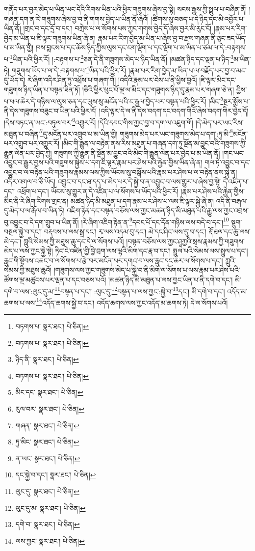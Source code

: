 གནོད་པར་བྱར་མེད་པ་ཡིན་ཡང་དེའི་རིགས་ཡིན་པའི་ཕྱིར་གཟུགས་ཞེས་བྱ་སྟེ། སངས་རྒྱས་ཀྱི་སྤྲུལ་པ་བཞིན་ནོ། །གཞན་དག་ན་རེ་གཟུགས་ཞེས་བྱ་བ་ནི་གགས་བྱེད་པ་ཡིན་ནོ་ཞེའོ། །ཚིགས་སུ་བཅད་པ་དེ་ཉིད་དང་མི་འབྱོར་པ་ཡིན་ནོ། །གྲང་བ་དང་དྲོ་བ་དང་། བཀྲེས་པ་ལ་སོགས་པས་ཀྱང་གགས་བྱེད་དོ་ཞེས་བྱར་མི་རུང་ངོ། །རྣམ་པར་རིག་བྱེད་མ་ཡིན་པ་ཇི་ལྟར་གཟུགས་ཡིན་ཞེ་ན། རྣམ་པར་རིག་བྱེད་མ་ཡིན་པ་ཞེས་བྱ་བ་རྫས་གཞན་ནི་ཅུང་ཟད་ཡོད་པ་མ་ཡིན་གྱི། ཁས་བླངས་པ་དང་ཆོས་ཉིད་ཀྱིས་ལུས་དང་ངག་ལྡོག་པ་དང་ལྡོག་པ་མ་ཡིན་པ་ཙམ་ལ་དེ་:བརྟགས་པ་\footnote{བཏགས་པ་  སྣར་ཐང་།  པེ་ཅིན། }ཡིན་པའི་ཕྱིར་རོ། །:བརྟགས་པ་\footnote{བཏགས་པ་  སྣར་ཐང་།  པེ་ཅིན། }ཅན་དེ་ནི་གཟུགས་མེད་པ་ཉིད་ཡིན་ནོ། །མཚན་ཉིད་དང་ལྡན་པ་ཉིད་\footnote{ཉིད་ནི་  སྣར་ཐང་།  པེ་ཅིན། }མ་ཡིན་ཏེ། གཟུགས་ཡོད་པ་ལ་དེ་:བརྟགས་པ་\footnote{བཏགས་པ་  སྣར་ཐང་།  པེ་ཅིན། }ཡིན་པའི་ཕྱིར་རོ། །རྣམ་པར་རིག་བྱེད་མ་ཡིན་པ་ལ་བརྗོད་པར་བྱ་བ་མང་དུ་ཡོད་དེ། རེ་ཞིག་འདིར་ཤིན་ཏུ་འཕྲོས་པ་གཞག་གོ། །འདིའི་རྣམ་པར་ངེས་པ་ནི་ཕྱིས་བྱའོ། །ཇི་ལྟར་མིང་དང་གཟུགས་ཉིད་ཡིན་པ་བསྟན་ཟིན་ཏོ། །ཅིའི་ཕྱིར་ཕུང་པོ་ལྔ་ལ་མིང་དང་གཟུགས་ཉིད་དུ་རྣམ་པར་གཞག་ཅེ་ན། བྱིས་པ་ཕལ་ཆེར་དེ་གཉིས་ལ་ལུས་ཅན་དང་ལུས་སུ་མངོན་པའི་ང་རྒྱལ་བྱེད་པར་བསྟན་པའི་ཕྱིར་རོ། །མིང་\footnote{མིང་དང་  སྣར་ཐང་།  པེ་ཅིན། }སྔར་སྨོས་པ་ནི་དེས་གཟུགས་བཟུང་བ་ཡིན་པའི་ཕྱིར་རོ། །འདི་ལྟར་དེ་ལ་ནི་དེས་བདག་དང་བདག་གིའོ་ཞེས་བདག་གིར་བྱེད་དོ། །དེས་བཏང་ན་ཡང་:བཏུལ་བར་\footnote{རུལ་བར་  སྣར་ཐང་།  པེ་ཅིན། }འགྱུར་རོ། །དེའི་དབང་གིས་ཀྱང་བྱ་བ་དག་ལ་འཇུག་གོ། །དེ་མེད་པར་ཡང་རིས་མཐུན་པ་བཞིན་\footnote{གཞན་  སྣར་ཐང་།  པེ་ཅིན། }དུ་མངོན་པར་འགྲུབ་པ་མ་ཡིན་གྱི། གཟུགས་མེད་པར་ཡང་གཟུགས་མེད་པ་དག་:ཏུ་མི་\footnote{ཏུ་མིང་  སྣར་ཐང་།  པེ་ཅིན། }མངོན་པར་འགྲུབ་པར་འགྱུར་རོ། །མིང་གི་རྒྱུན་ལ་བརྟེན་ནས་རིས་མཐུན་པ་གཞན་དག་ཏུ་སྔོན་མ་བྱུང་བའི་གཟུགས་ཀྱི་རྒྱུན་ལེན་པར་བྱེད་ཀྱི། གཟུགས་ཀྱི་རྒྱུན་ནི་སྔོན་མ་བྱུང་བའི་མིང་གི་རྒྱུན་ལེན་པར་བྱེད་པ་མ་ཡིན་ནོ། །གང་ཡང་འབྱུང་བ་རྒྱུར་བྱས་པའི་གཟུགས་སྐྱེས་པ་དག་ཇི་ལྟར་རྣམ་པར་ཤེས་པའི་རྐྱེན་གྱིས་ཡིན་ཞེ་ན། གལ་ཏེ་འབྱུང་བ་དང་འབྱུང་བ་ལ་བརྟེན་པའི་གཟུགས་རྣམས་ལས་ཀྱིས་ཡོངས་སུ་བསྒོས་པའི་རྣམ་པར་ཤེས་པ་ལ་བརྟེན་ནས་སྐྱེ་ན། འདིར་འགལ་བ་ཅི་ཡོད། འབྱུང་བ་དང་ཐ་དད་པ་མེད་པར་དེ་སྐྱེ་བ་ན་འབྱུང་བ་ལས་གྱུར་པ་ཞེས་བྱ་སྟེ། དེ་འཛིན་པ་དང་། འཕྲོག་པ་དང་། ཡོངས་སུ་གྱུར་ན་དེ་འཛིན་པ་ལ་སོགས་པ་ཡོད་པའི་ཕྱིར་རོ། །རྣམ་པར་ཤེས་པའི་རྐྱེན་གྱིས་མིང་ནི་རེ་ཞིག་རིགས་གྲང་ན། མཚན་ཉིད་མི་མཐུན་པ་དག་རྣམ་པར་ཤེས་པ་ལས་ཇི་ལྟར་སྐྱེ་ཞེ་ན། འདི་ནི་བརྒལ་དུ་མེད་པ་ལ་རྒོལ་བ་ཡིན་ཏེ། འཇིག་རྟེན་དང་བསྟན་བཅོས་ལས་ཀྱང་མཚན་ཉིད་མི་མཐུན་པའི་རྒྱུ་ལས་ཀྱང་འབྲས་བུ་འབྱུང་བ་དེ་དག་གྲུབ་པ་ཡིན་ནོ། །རེ་ཞིག་འཇིག་རྟེན་ན་\footnote{ན་ཡང་  སྣར་ཐང་།  པེ་ཅིན། }དབང་པོ་དང་དོན་གཉིས་ལས་བདེ་བ་དང་།\footnote{དང་སྐྱེ་བ་དང་།  སྣར་ཐང་།  པེ་ཅིན། } སྡུག་བསྔལ་སྐྱེ་བ་དང་། བརྡབས་པ་ལས་སྒྲ་དང་། རྭ་ལས་འདམ་བུ་དང་། མེ་དང་ཤིང་ལས་དུ་བ་དང་། རྡོ་ཐལ་དང་ཆུ་ལས་མེ་དང་། ཀླུའི་སེམས་ཀྱི་མཐུས་ཆུ་དང་དེ་ལ་སོགས་པའོ། །བསྟན་བཅོས་ལས་ཀྱང་ཤཱཀྱའི་སྲས་རྣམས་ཀྱི་གཟུགས་མེད་པ་ལས་ཀྱང་སྐྱེ་སྟེ། ཏིང་ངེ་འཛིན་གྱི་བྱེ་བྲག་ལས་ལྷའི་མིག་དང་རྣ་བ་དང་། སྤྲུལ་པའི་སེམས་ལས་སྤྲུལ་པ་དང་། རླུང་གི་སྟོབས་འཆང་བ་ལ་སོགས་པ་རྩེ་བར་མངོན་པར་དགའ་བ་ལས་རླུང་དང་ཆར་ལ་སོགས་པ་དང་། ཀླུའི་སེམས་ཀྱི་མཐུས་ཆུའོ། །གཟུགས་ལས་ཀྱང་གཟུགས་མེད་པ་སྐྱེ་བ་ནི་མིག་ལ་སོགས་པ་ལས་རྣམ་པར་ཤེས་པའི་ཚོགས་ལྔ་མཚུངས་པར་ལྡན་པ་དང་བཅས་པའོ། །མཚན་ཉིད་མི་མཐུན་པ་ལས་ཀྱང་ཡིན་པ་ནི་དགེ་བ་དང་། མི་དགེ་བ་ལས་:ལུང་དུ་མ་\footnote{ལུང་དུ་  སྣར་ཐང་།  པེ་ཅིན། }བསྟན་པ་དང་། :ལུང་དུ་\footnote{ལུང་དུ་མ་  སྣར་ཐང་།  པེ་ཅིན། }བསྟན་པ་ལས་ཀྱང་:སྐྱེ་བ་\footnote{དགེ་བ་  སྣར་ཐང་།  པེ་ཅིན། }དང་། མི་དགེ་བ་དང་། འདོད་མ་ཆགས་པ་ལས་\footnote{ལས་ཀྱང་  སྣར་ཐང་།  པེ་ཅིན། }འདོད་ཆགས་སྐྱེ་བ་དང་། འདོད་ཆགས་ལས་ཀྱང་འདོད་མ་ཆགས་ཏེ། དེ་ལ་སོགས་པའོ། 